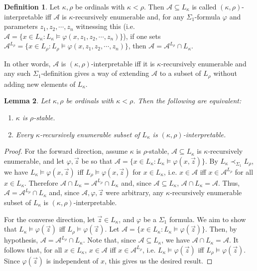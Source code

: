 \documentclass{article}
\theoremstyle{definition}
\newtheorem{definition}{Definition}[section]
\theoremstyle{plain}
\theoremstyle{plain}
\theoremstyle{plain}
\theoremstyle{plain}
\theoremstyle{remark}
\theoremstyle{remark}
\theoremstyle{remark}
\theoremstyle{plain}
\newtheorem{lemma}[definition]{Lemma}
\theoremstyle{plain}
\theoremstyle{plain}
\begin{document}
\begin{definition}
\label{Interpretable}
Let $\kappa, \rho$ be ordinals with $\kappa < \rho$. Then $\mathcal{A} \subseteq L_\kappa$ is called $(\kappa, \rho)$-interpretable iff $\mathcal{A}$ is $\kappa$-recursively enumerable and, for any $\Sigma_1$-formula $\varphi$ and parameters $z_1, z_2, \cdots, z_n$ witnessing this (i.e. $\mathcal{A} = \{x \in L_\kappa: L_\kappa \models \varphi(x, z_1, z_2, \cdots, z_n)\}$), if one sets $\mathcal{A}^{L_\rho} = \{x \in L_\rho: L_\rho \models \varphi(x, z_1, z_2, \cdots, z_n)\}$, then $\mathcal{A} = \mathcal{A}^{L_\rho} \cap L_\kappa$.
\end{definition}

In other words, $\mathcal{A}$ is $(\kappa, \rho)$-interpretable iff it is $\kappa$-recursively enumerable and any such $\Sigma_1$-definition gives a way of extending $\mathcal{A}$ to a subset of $L_\rho$ without adding new elements of $L_\kappa$.

\begin{lemma}
\label{StabilityToInterpretability}
Let $\kappa, \rho$ be ordinals with $\kappa < \rho$. Then the following are equivalent:

\begin{enumerate}
    \item $\kappa$ is $\rho$-stable.
    \item Every $\kappa$-recursively enumerable subset of $L_\kappa$ is $(\kappa, \rho)$-interpretable.
\end{enumerate}
\end{lemma}

\begin{proof}
For the forward direction, assume $\kappa$ is $\rho$-stable, $\mathcal{A} \subseteq L_\kappa$ is $\kappa$-recursively enumerable, and let $\varphi, \vec{z}$ be so that $\mathcal{A} = \{x \in L_\kappa: L_\kappa \models \varphi(x, \vec{z})\}$. By $L_\kappa \prec_{\Sigma_1} L_\rho$, we have $L_\kappa \models \varphi(x, \vec{z})$ iff $L_\rho \models \varphi(x, \vec{z})$ for $x \in L_\kappa$, i.e. $x \in \mathcal{A}$ iff $x \in \mathcal{A}^{L_\rho}$ for all $x \in L_\kappa$. Therefore $\mathcal{A} \cap L_\kappa = \mathcal{A}^{L_\rho} \cap L_\kappa$ and, since $\mathcal{A} \subseteq L_\kappa$, $\mathcal{A} \cap L_\kappa = \mathcal{A}$. Thus, $\mathcal{A} = \mathcal{A}^{L_\rho} \cap L_\kappa$ and, since $\mathcal{A}, \varphi, \vec{z}$ were arbitrary, any $\kappa$-recursively enumerable subset of $L_\kappa$ is $(\kappa, \rho)$-interpretable.

For the converse direction, let $\vec{z} \in L_\kappa$, and $\varphi$ be a $\Sigma_1$ formula. We aim to show that $L_\kappa \models \varphi(\vec{z})$ iff $L_\rho \models \varphi(\vec{z})$. Let $\mathcal{A} = \{x \in L_\kappa: L_\kappa \models \varphi(\vec{z})\}$. Then, by hypothesis, $\mathcal{A} = \mathcal{A}^{L_\rho} \cap L_\kappa$. Note that, since $\mathcal{A} \subseteq L_\kappa$, we have $\mathcal{A} \cap L_\kappa = \mathcal{A}$. It follows that, for all $x \in L_\kappa$, $x \in \mathcal{A}$ iff $x \in \mathcal{A}^{L_\rho}$, i.e. $L_\kappa \models \varphi(\vec{z})$ iff $L_\rho \models \varphi(\vec{z})$. Since $\varphi(\vec{z})$ is independent of $x$, this gives us the desired result.
\end{proof}
\end{document}
